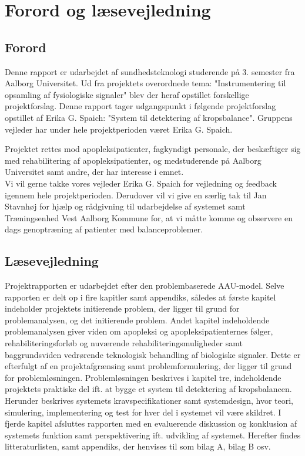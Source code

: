 \chapter*{Forord og læsevejledning}
\section{Forord}
Denne rapport er udarbejdet af sundhedsteknologi studerende på 3. semester fra Aalborg Universitet. Ud fra projektets overordnede tema: "Instrumentering til opsamling af fysiologiske signaler" blev der heraf opstillet forskellige projektforslag. Denne rapport tager udgangspunkt i følgende projektforslag opstillet af Erika G. Spaich: "System til detektering af kropsbalance". Gruppens vejleder har under hele projektperioden været Erika G. Spaich.

Projektet rettes mod apopleksipatienter, fagkyndigt personale, der beskæftiger sig med rehabilitering af apopleksipatienter, og medstuderende på Aalborg Universitet samt andre, der har interesse i emnet. \\
Vi vil gerne takke vores vejleder Erika G. Spaich for vejledning og feedback igennem hele projektperioden. Derudover vil vi give en særlig tak til Jan Stavnhøj for hjælp og rådgivning til udarbejdelse af systemet samt Træningsenhed Vest Aalborg Kommune for, at vi måtte komme og observere en dags genoptræning af patienter med balanceproblemer. 

\section{Læsevejledning}
Projektrapporten er udarbejdet efter den problembaserede AAU-model. Selve rapporten er delt op i fire kapitler samt appendiks, således at første kapitel indeholder projektets initierende problem, der ligger til grund for problemanalysen, og det initierende problem. Andet kapitel indeholdende problemanalysen giver viden om apopleksi og apopleksipatienternes følger, rehabiliteringsforløb og nuværende rehabiliteringsmuligheder samt baggrundsviden vedrørende teknologisk behandling af biologiske signaler.  Dette er efterfulgt af en projektafgrænsing samt problemformulering, der ligger til grund for problemløsningen. Problemløsningen beskrives i kapitel tre, indeholdende projektets praktiske del ift. at bygge et system til detektering af kropsbalancen. Herunder beskrives systemets kravspecifikationer samt systemdesign, hvor teori, simulering, implementering og test for hver del i systemet vil være skildret. I fjerde kapitel afsluttes rapporten med en evaluerende diskussion og konklusion af systemets funktion samt perspektivering ift. udvikling af systemet. Herefter findes litteraturlisten, samt appendiks, der henvises til som bilag A, bilag B osv. 

